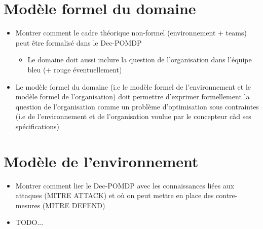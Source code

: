 \section{Modèle formel du domaine}
\begin{itemize}

    \item Montrer comment le cadre théorique non-formel (environnement + teams) peut être formalisé dans le Dec-POMDP
          \begin{itemize}
              \item Le domaine doit aussi inclure la question de l'organisation dans l'équipe bleu (+ rouge éventuellement)
          \end{itemize}
    \item Le modèle formel du domaine (i.e le modèle formel de l'environnement et le modèle formel de l'organisation) doit permettre d'exprimer formellement la question de l'organisation comme un problème d'optimisation sous contraintes (i.e de l'environnement et de l'organisation voulue par le concepteur càd ses spécifications)
\end{itemize}

\section{Modèle de l'environnement}
\begin{itemize}

    \item Montrer comment lier le Dec-POMDP avec les connaissances liées aux attaques (MITRE ATTACK) et où on peut mettre en place des contre-mesures (MITRE DEFEND)
    \item TODO...
\end{itemize}

